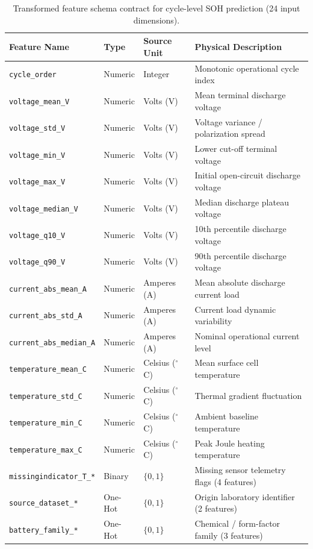\documentclass[a4paper,fleqn]{cas-sc}
\begin{document}
\begin{table}[htbp]
\centering
\caption{Transformed feature schema contract for cycle-level SOH prediction (24 input dimensions).}
\label{tab:feature_schema}
\footnotesize
\renewcommand{\arraystretch}{1.15}
\begin{tabular*}{\linewidth}{@{\extracolsep{\fill}}lllp{4.2cm}@{}}
\toprule
\textbf{Feature Name} & \textbf{Type} & \textbf{Source Unit} & \textbf{Physical Description} \\
\midrule
\texttt{cycle\_order} & Numeric & Integer & Monotonic operational cycle index \\
\texttt{voltage\_mean\_V} & Numeric & Volts (V) & Mean terminal discharge voltage \\
\texttt{voltage\_std\_V} & Numeric & Volts (V) & Voltage variance / polarization spread \\
\texttt{voltage\_min\_V} & Numeric & Volts (V) & Lower cut-off terminal voltage \\
\texttt{voltage\_max\_V} & Numeric & Volts (V) & Initial open-circuit discharge voltage \\
\texttt{voltage\_median\_V} & Numeric & Volts (V) & Median discharge plateau voltage \\
\texttt{voltage\_q10\_V} & Numeric & Volts (V) & 10th percentile discharge voltage \\
\texttt{voltage\_q90\_V} & Numeric & Volts (V) & 90th percentile discharge voltage \\
\texttt{current\_abs\_mean\_A} & Numeric & Amperes (A) & Mean absolute discharge current load \\
\texttt{current\_abs\_std\_A} & Numeric & Amperes (A) & Current load dynamic variability \\
\texttt{current\_abs\_median\_A} & Numeric & Amperes (A) & Nominal operational current level \\
\texttt{temperature\_mean\_C} & Numeric & Celsius ($^\circ$C) & Mean surface cell temperature \\
\texttt{temperature\_std\_C} & Numeric & Celsius ($^\circ$C) & Thermal gradient fluctuation \\
\texttt{temperature\_min\_C} & Numeric & Celsius ($^\circ$C) & Ambient baseline temperature \\
\texttt{temperature\_max\_C} & Numeric & Celsius ($^\circ$C) & Peak Joule heating temperature \\
\texttt{missingindicator\_T\_*} & Binary & $\{0, 1\}$ & Missing sensor telemetry flags (4 features) \\
\texttt{source\_dataset\_*} & One-Hot & $\{0, 1\}$ & Origin laboratory identifier (2 features) \\
\texttt{battery\_family\_*} & One-Hot & $\{0, 1\}$ & Chemical / form-factor family (3 features) \\
\bottomrule
\end{tabular*}
\end{table}
\end{document}

